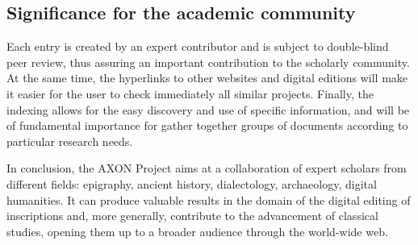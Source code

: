 \documentclass[amsthm,ebook]{saparticle}
\begin{document}
\subsection{Significance for the academic community}





Each entry is created by an expert contributor and is subject to double-blind peer review, thus assuring an important
contribution to the scholarly community. At the same time, the hyperlinks to other websites and digital editions will
make it easier for the user to check immediately all similar projects. Finally, the indexing allows for the easy
discovery and use of specific information, and will be of fundamental importance for gather together groups of
documents according to particular research needs.

In conclusion, the AXON Project aims at a collaboration of expert scholars from different fields: epigraphy, ancient
history, dialectology, archaeology, digital humanities. It can produce valuable results in the domain of the digital
editing of inscriptions and, more generally, contribute to the advancement of classical studies, opening them up to a
broader audience through the world-wide web.




\end{document}

